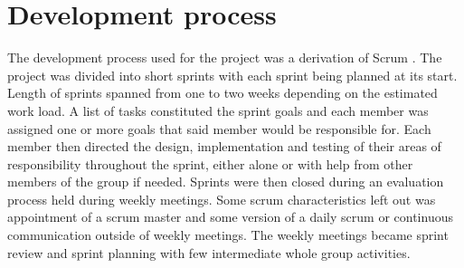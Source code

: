 \section{Development process}


The development process used for the project was a derivation of Scrum \cite{Scrum}. The project
was divided into short sprints with each sprint being planned at its start. Length of sprints 
spanned from one to two weeks depending on the estimated work load.
A list of tasks constituted the sprint goals and each member was assigned one or more goals
that said member would be responsible for. Each member then directed the design,
implementation and testing of their areas of responsibility throughout the sprint, either alone or
with help from other members of the group if needed. Sprints were then closed during an
evaluation process held during weekly meetings. Some scrum characteristics left out was appointment of a scrum master and some version of a daily scrum or continuous communication outside of weekly meetings. The weekly meetings became sprint review and sprint planning with few intermediate whole group activities.